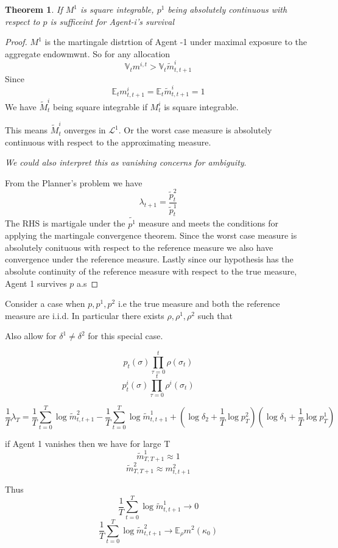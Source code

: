 \documentclass[12pt]{article}
\newtheorem{theorem}{Theorem}
\begin{document}
\begin{theorem}
If $M^1$ is square integrable, $p^1$ being absolutely continuous with respect to $p$ is sufficeint for Agent-i's survival
\end{theorem}
\begin{proof}
$M^1$ is the martingale distrtion of Agent -1 under maximal exposure to the aggregate endowmwnt. So for any allocation 
\[\mathbb{V}_tm^{i,t} > \mathbb{V}_t \tilde{m}^{i}_{t,t+1}\]
Since \[\mathbb{E}_tm^i_{t,t+1}=\mathbb{E}_t\tilde{m}^i_{t,t+1}=1\]
We have $\tilde{M}^i_t$ being square integrable if $M^i_t$ is square integrable. 

This means $\tilde{M}^i_t$ onverges in $\mathcal{L}^1$. Or the worst case measure is absolutely continuous with respect to the approximating measure. 

\emph{We could also interpret this as vanishing concerns for ambiguity}. 

From the Planner's problem we have
\[\lambda_{t+1}=\frac{\tilde{p}^2_t}{\tilde{p}^1_t}\]
The RHS is martigale under the $\tilde{p^1}$ measure and meets the conditions for applying the martingale convergence theorem. Since the worst case measure is absolutely conituous with respect to the reference measure we also have convergence under the reference measure. Lastly since our hypothesis has the absolute continuity of the reference measure with respect to the true measure, Agent 1 survives $p$ a.s

 
\end{proof}

Consider a case when $p,p^1,p^2$ i.e the true measure and both the reference measure are i.i.d. In particular there exists $\rho,\rho^1,\rho^2$ such that

Also allow for $\delta^1\neq\delta^2$ for this special case.

\[p_t(\sigma)\prod_{\tau=0}^{t}\rho(\sigma_t)\]
\[p^i_t(\sigma)\prod_{\tau=0}^{t}\rho^i(\sigma_t)\]

\[\frac{1}{T}\lambda_{T}=\frac{1}{T}\sum_{t=0}^{T}\log\tilde{m}^2_{t,t+1}-\frac{1}{T}\sum_{t=0}^{T}\log \tilde{m}^1_{t,t+1}+ \left(\log{\delta_2} + \frac{1}{T}\log{p^2_T}\right)
\left(\log{\delta_1} + \frac{1}{T}\log{p^1_T}\right)\]

if Agent 1 vanishes then we have for large T
\[\tilde{m}^1_{T,T+1} \approx 1\]
\[\tilde{m}^2_{T,T+1} \approx m^2_{t,t+1}\]

Thus 
\[\frac{1}{T}\sum_{t=0}^{T}\log\tilde{m}^1_{t,t+1} \to 0\]
\[\frac{1}{T}\sum_{t=0}^{T}\log\tilde{m}^2_{t,t+1} \to \mathbb{E}_\rho m^2 (\kappa_0)\]
\end{document}
